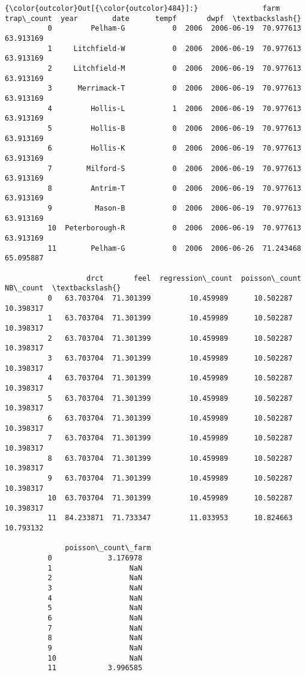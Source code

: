 \documentclass[11pt]{article}
\begin{document}
\begin{Verbatim}[commandchars=\\\{\}]
{\color{outcolor}Out[{\color{outcolor}484}]:}               farm  trap\_count  year        date      tempf       dwpf  \textbackslash{}
          0         Pelham-G           0  2006  2006-06-19  70.977613  63.913169   
          1     Litchfield-W           0  2006  2006-06-19  70.977613  63.913169   
          2     Litchfield-M           0  2006  2006-06-19  70.977613  63.913169   
          3      Merrimack-T           0  2006  2006-06-19  70.977613  63.913169   
          4         Hollis-L           1  2006  2006-06-19  70.977613  63.913169   
          5         Hollis-B           0  2006  2006-06-19  70.977613  63.913169   
          6         Hollis-K           0  2006  2006-06-19  70.977613  63.913169   
          7        Milford-S           0  2006  2006-06-19  70.977613  63.913169   
          8         Antrim-T           0  2006  2006-06-19  70.977613  63.913169   
          9          Mason-B           0  2006  2006-06-19  70.977613  63.913169   
          10  Peterborough-R           0  2006  2006-06-19  70.977613  63.913169   
          11        Pelham-G           0  2006  2006-06-26  71.243468  65.095887   
          
                   drct       feel  regression\_count  poisson\_count   NB\_count  \textbackslash{}
          0   63.703704  71.301399         10.459989      10.502287  10.398317   
          1   63.703704  71.301399         10.459989      10.502287  10.398317   
          2   63.703704  71.301399         10.459989      10.502287  10.398317   
          3   63.703704  71.301399         10.459989      10.502287  10.398317   
          4   63.703704  71.301399         10.459989      10.502287  10.398317   
          5   63.703704  71.301399         10.459989      10.502287  10.398317   
          6   63.703704  71.301399         10.459989      10.502287  10.398317   
          7   63.703704  71.301399         10.459989      10.502287  10.398317   
          8   63.703704  71.301399         10.459989      10.502287  10.398317   
          9   63.703704  71.301399         10.459989      10.502287  10.398317   
          10  63.703704  71.301399         10.459989      10.502287  10.398317   
          11  84.233871  71.733347         11.033953      10.824663  10.793132   
          
              poisson\_count\_farm  
          0             3.176978  
          1                  NaN  
          2                  NaN  
          3                  NaN  
          4                  NaN  
          5                  NaN  
          6                  NaN  
          7                  NaN  
          8                  NaN  
          9                  NaN  
          10                 NaN  
          11            3.996585  
\end{Verbatim}
            
\end{document}
